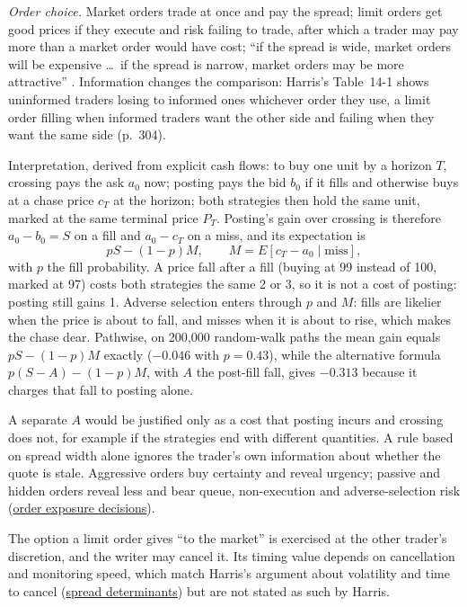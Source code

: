 \begin{qfresult}
\emph{Order choice.} Market orders trade at once and pay the spread; limit orders get good prices if they execute and risk failing to trade, after which a trader may pay more than a market order would have cost; ``if the spread is wide, market orders will be expensive \dots\ if the spread is narrow, market orders may be more attractive'' \citep[chap.~14, sec.~14.4, p.~304]{alpha-harris}. Information changes the comparison: Harris's Table~14-1 shows uninformed traders losing to informed ones whichever order they use, a limit order filling when informed traders want the other side and failing when they want the same side (p.~304).

Interpretation, derived from explicit cash flows: to buy one unit by a horizon $T$, crossing pays the ask $a_0$ now; posting pays the bid $b_0$ if it fills and otherwise buys at a chase price $c_T$ at the horizon; both strategies then hold the same unit, marked at the same terminal price $P_T$. Posting's gain over crossing is therefore $a_0-b_0=S$ on a fill and $a_0-c_T$ on a miss, and its expectation is
\[ pS-(1-p)M,\qquad M=E[c_T-a_0\mid\text{miss}], \]
with $p$ the fill probability. A price fall after a fill (buying at 99 instead of 100, marked at 97) costs both strategies the same 2 or 3, so it is not a cost of posting: posting still gains 1. Adverse selection enters through $p$ and $M$: fills are likelier when the price is about to fall, and misses when it is about to rise, which makes the chase dear. Pathwise, on 200{,}000 random-walk paths the mean gain equals $pS-(1-p)M$ exactly ($-0.046$ with $p=0.43$), while the alternative formula $p(S-A)-(1-p)M$, with $A$ the post-fill fall, gives $-0.313$ because it charges that fall to posting alone.

A separate $A$ would be justified only as a cost that posting incurs and crossing does not, for example if the strategies end with different quantities. A rule based on spread width alone ignores the trader's own information about whether the quote is stale. Aggressive orders buy certainty and reveal urgency; passive and hidden orders reveal less and bear queue, non-execution and adverse-selection risk (\hyperref[def:order-exposure-decisions]{order exposure decisions}).

 The option a limit order gives ``to the market'' is exercised at the other trader's discretion, and the writer may cancel it. Its timing value depends on cancellation and monitoring speed, which match Harris's argument about volatility and time to cancel (\hyperref[res:spread-determinants]{spread determinants}) but are not stated as such by Harris.


\end{qfresult}
